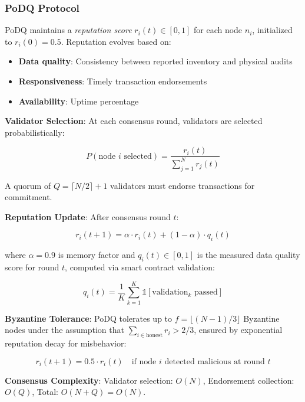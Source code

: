 \documentclass[times,10pt,twocolumn]{jucs2e}
\begin{document}
\subsubsection{PoDQ Protocol}

PoDQ maintains a \textit{reputation score} $r_i(t) \in [0, 1]$ for each node $n_i$, initialized to $r_i(0) = 0.5$. Reputation evolves based on:
\begin{itemize}
\item \textbf{Data quality}: Consistency between reported inventory and physical audits
\item \textbf{Responsiveness}: Timely transaction endorsements
\item \textbf{Availability}: Uptime percentage
\end{itemize}

\textbf{Validator Selection}: At each consensus round, validators are selected probabilistically:

\begin{equation}
P(\text{node } i \text{ selected}) = \frac{r_i(t)}{\sum_{j=1}^N r_j(t)}
\end{equation}

A quorum of $Q = \lceil N/2 \rceil + 1$ validators must endorse transactions for commitment.

\textbf{Reputation Update}: After consensus round $t$:

\begin{equation}
r_i(t+1) = \alpha \cdot r_i(t) + (1-\alpha) \cdot q_i(t)
\end{equation}

where $\alpha = 0.9$ is memory factor and $q_i(t) \in [0,1]$ is the measured data quality score for round $t$, computed via smart contract validation:

\begin{equation}
q_i(t) = \frac{1}{K} \sum_{k=1}^K \mathbb{1}[\text{validation}_k \text{ passed}]
\end{equation}

\textbf{Byzantine Tolerance}: PoDQ tolerates up to $f = \lfloor (N-1)/3 \rfloor$ Byzantine nodes under the assumption that $\sum_{i \in \text{honest}} r_i > 2/3$, ensured by exponential reputation decay for misbehavior:

\begin{equation}
r_i(t+1) = 0.5 \cdot r_i(t) \quad \text{if node } i \text{ detected malicious at round } t
\end{equation}

\textbf{Consensus Complexity}: Validator selection: $O(N)$, Endorsement collection: $O(Q)$, Total: $O(N + Q) = O(N)$.
\end{document}
